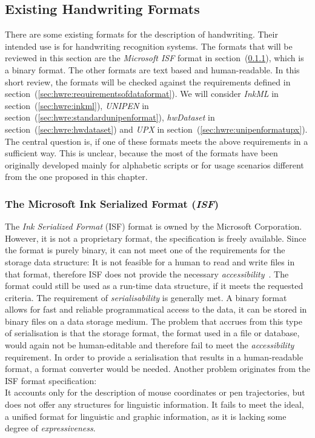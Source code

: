 

\subsection{Existing Handwriting Formats}
\label{sec:hwre:existingformats}

There are some existing formats for the description of handwriting. Their 
intended use is for handwriting recognition systems. The formats that will be
reviewed in this section are the \emph{Microsoft ISF} format in 
section~(\ref{sec:hwre:msisfformat}), which is a binary format.
The other formats are text based and human-readable. In this short review,
the formats will be checked against the requirements defined in 
section~(\ref{sec:hwre:requirementsofdataformat}). We will consider 
\emph{InkML} in section~(\ref{sec:hwre:inkml}), 
\emph{UNIPEN} in section~(\ref{sec:hwre:standardunipenformat}), 
\emph{hwDataset} in section~(\ref{sec:hwre:hwdataset}) and 
\emph{UPX} in section~(\ref{sec:hwre:unipenformatupx}). 
The central question is, if one of these formats meets the above requirements in 
a sufficient way. This is unclear, because the most of the formats have been 
originally developed mainly for alphabetic scripts or for usage scenarios 
different from the one proposed in this chapter.

\subsubsection{The Microsoft Ink Serialized Format (\emph{ISF})}
\label{sec:hwre:msisfformat}

The \emph{Ink Serialized Format} (ISF) format is owned by the 
Microsoft Corporation. However, it is not a proprietary format, the 
specification is freely available. Since the format is purely binary, 
it can not meet one of the requirements for the storage data structure:
It is not feasible for a human to read and write files in that format,
therefore ISF does not provide the necessary 
\emph{accessibility}~. The format could still be used 
as a run-time data structure, if it meets the requested criteria.
The requirement of \emph{serialisability} is generally met. A binary format 
allows for fast and reliable programmatical access to the data, it can be stored
in binary files on a data storage medium. The problem that accrues from this 
type of serialisation is that the storage format, the format used in a file or 
database, would again not be human-editable and therefore fail to meet the 
\emph{accessibility} requirement. 
In order to provide a serialisation that results in a human-readable format, 
a format converter would be needed. Another problem originates from the 
ISF format specification: \\
It accounts only for the description of mouse coordinates or pen trajectories, 
but does not offer any structures for linguistic information. 
It fails to meet the ideal, a unified format for linguistic and graphic 
information, as it is lacking some degree of \emph{expressiveness}.

